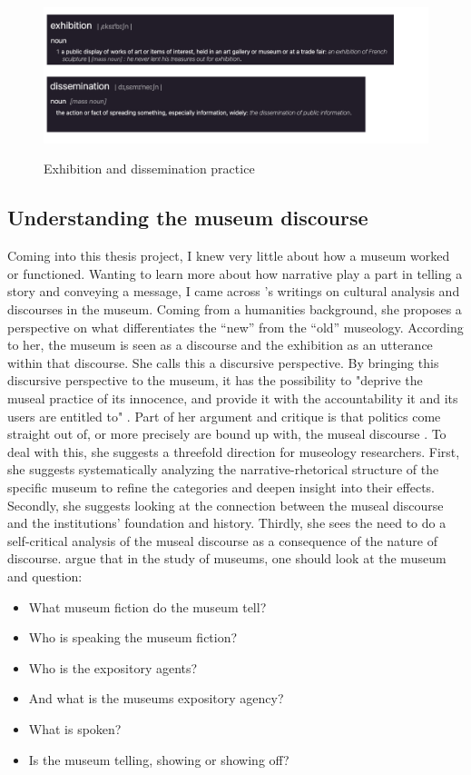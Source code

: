 \begin{figure}[H]
\centering
\includegraphics[width=14cm]{pictures/background/exh_diss.png}
\caption{Exhibition and dissemination practice}{\autocite{Oxford_dictionary}}
\end{figure}


\subsection{Understanding the museum discourse}
Coming into this thesis project, I knew very little about how a museum worked or functioned. Wanting to learn more about how narrative play a part in telling a story and conveying a message, I came across \autocite{Miekebal_book}'s writings on cultural analysis and discourses in the museum. Coming from a humanities background, she proposes a perspective on what differentiates the “new” from the “old” museology. According to her, the museum is seen as a discourse and the exhibition as an utterance within that discourse. She calls this a discursive perspective. By bringing this discursive perspective to the museum, it has the possibility to "deprive the museal practice of its innocence, and provide it with the accountability it and its users are entitled to" \autocite[p. 214]{Thi_book}. Part of her argument and critique is that politics come straight out of, or more precisely are bound up with, the museal discourse \autocite[p. 214]{Thi_book}. To deal with this, she suggests a threefold direction for museology researchers. First, she suggests systematically analyzing the narrative-rhetorical structure of the specific museum to refine the categories and deepen insight into their effects. Secondly, she suggests looking at the connection between the museal discourse and the institutions' foundation and history. Thirdly, she sees the need to do a self-critical analysis of the museal discourse as a consequence of the nature of discourse. \autocite{Miekebal_book} argue that in the study of museums, one should look at the museum and question:

\begin{itemize}
    \item What museum fiction do the museum tell? 
    \item Who is speaking the museum fiction?
    \item Who is the expository agents?
    \item And what is the museums expository agency?
    \item What is spoken? 
    \item Is the museum telling, showing or showing off?
\end{itemize}

